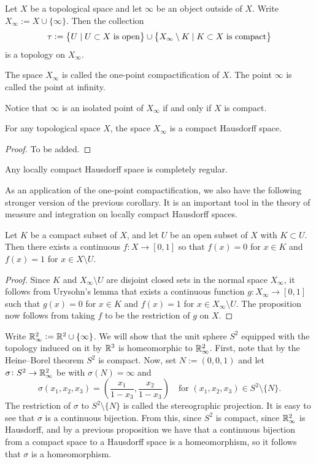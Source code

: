 \documentclass[11pt,a4paper]{article}
\begin{document}
Let $X$ be a topological space and let $\infty$ be an object outside of $X$.
Write $X_{\infty} := X \cup \{\infty\}$. Then the collection
\[
  \tau :=
  \left\{U \mid \text{$U \subset X$ is open}\right\} \cup
  \left\{X_{\infty} \setminus K \mid \text{$K \subset X$ is compact}\right\}
\]
is a topology on $X_{\infty}$.

\begin{remark}
  The space $X_{\infty}$ is called the one-point compactification of $X$.
  The point $\infty$ is called the point at infinity.
\end{remark}

Notice that $\infty$ is an isolated point of $X_{\infty}$ if and only if
$X$ is compact.

\begin{proposition}
  For any topological space $X$, the space $X_{\infty}$ is a compact
  Hausdorff space.
\end{proposition}
\begin{proof}
  To be added.
\end{proof}

\begin{corollary}
  Any locally compact Hausdorff space is completely regular.
\end{corollary}

As an application of the one-point compactification,
we also have the following stronger version of the previous corollary.
It is an important tool in the theory of measure and integration on 
locally compact Hausdorff spaces.

\begin{proposition}
  Let $K$ be a compact subset of $X$, and let $U$ be an open subset
  of $X$ with $K \subset U$.
  Then there exists a continuous $f \colon X \to [0, 1]$ so that 
  $f(x) = 0$ for $x \in K$ and $f(x) = 1$ for $x \in X \setminus U$.
\end{proposition}
\begin{proof}
  Since $K$ and $X_{\infty} \setminus U$ are disjoint closed sets in the
  normal space $X_{\infty}$, it follows from Urysohn's lemma that
  exists a continuous function $g \colon X_{\infty} \to [0,1]$ such that 
  $g(x) = 0$ for $x \in K$ and $f(x) = 1$ for $x \in X_{\infty} \setminus U$.
  The proposition now follows from taking $f$ to be the restriction of
  $g$ on $X$.
\end{proof}

Write $\mathbb{R}^2_\infty := \mathbb{R}^2 \cup \{\infty\}$.
We will show that the unit sphere $S^2$ equipped with the topology
induced on it by $\mathbb{R}^3$ is homeomorphic to $\mathbb{R}^2_\infty$.
First, note that by the Heine--Borel theorem $S^2$ is compact.
Now, set $N := (0,0,1)$ and let $\sigma \colon S^2 \to \mathbb{R}^2_\infty$ be
with $\sigma(N) = \infty$ and
\[
  \sigma(x_1,x_2,x_3) =
  \left(\frac{x_1}{1 - x_3}, \frac{x_2}{1 - x_3}\right) \quad
  \text{for $(x_1,x_2,x_3) \in S^2 \setminus \{N\}$}.
\]
The restriction of $\sigma$ to $S^2 \setminus \{N\}$ is called the
stereographic projection.
It is easy to see that $\sigma$ is a continuous bijection.
From this, since $S^2$ is compact,
since $\mathbb{R}^2_\infty$ is Hausdorff,
and by a previous proposition we have that a continuous bijection from
a compact space to a Hausdorff space is a homeomorphism,
so it follows that $\sigma$ is a homeomorphism.
\end{document}
